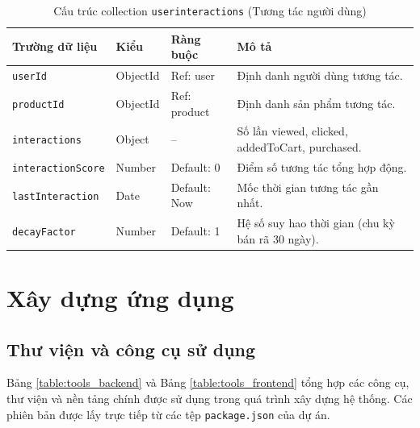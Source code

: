 \documentclass[../DoAn.tex]{subfiles}
\begin{document}
\begin{table}[H]
    \centering
    \caption{Cấu trúc collection \texttt{userinteractions} (Tương tác người dùng)}
    \label{table:schema_interaction}
    \small
    \setlength{\tabcolsep}{3pt}
    \begin{tabular}{|>{\raggedright\arraybackslash}p{3.0cm}|>{\raggedright\arraybackslash}p{1.7cm}|>{\raggedright\arraybackslash}p{2.6cm}|>{\raggedright\arraybackslash}p{5.3cm}|}
        \hline
        \textbf{Trường dữ liệu} & \textbf{Kiểu} & \textbf{Ràng buộc} & \textbf{Mô tả} \\ \hline
        \texttt{userId} & ObjectId & Ref: user & Định danh người dùng tương tác. \\ \hline
        \texttt{productId} & ObjectId & Ref: product & Định danh sản phẩm tương tác. \\ \hline
        \texttt{interactions} & Object & -- & Số lần viewed, clicked, addedToCart, purchased. \\ \hline
        \texttt{interaction}\allowbreak\texttt{Score} & Number & Default: 0 & Điểm số tương tác tổng hợp động. \\ \hline
        \texttt{last}\allowbreak\texttt{Interaction} & Date & Default: Now & Mốc thời gian tương tác gần nhất. \\ \hline
        \texttt{decayFactor} & Number & Default: 1 & Hệ số suy hao thời gian (chu kỳ bán rã 30 ngày). \\ \hline
    \end{tabular}
\end{table}

\section{Xây dựng ứng dụng}
\label{section:4.3}

\subsection{Thư viện và công cụ sử dụng}
Bảng \ref{table:tools_backend} và Bảng \ref{table:tools_frontend} tổng hợp các công cụ, thư viện và nền tảng chính được sử dụng trong quá trình xây dựng hệ thống. Các phiên bản được lấy trực tiếp từ các tệp \texttt{package.json} của dự án.
\end{document}
